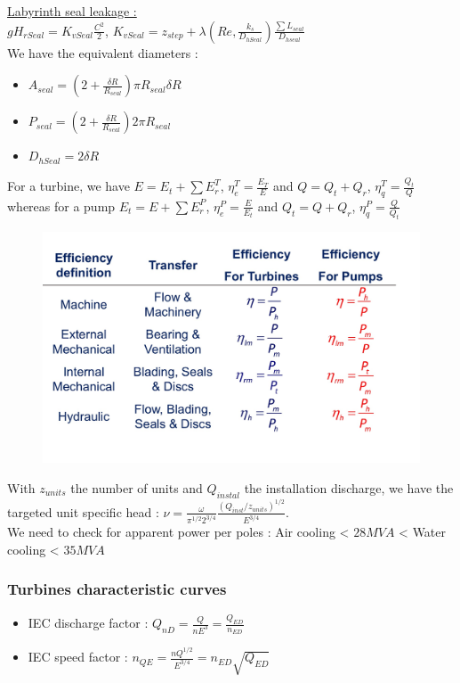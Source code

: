 \documentclass[../main.tex]{subfiles}
\begin{document}
\underline{Labyrinth seal leakage :}\\
$gH_{rSeal} = K_{vSeal} \frac{C^2}{2}$, $K_{vSeal} = z_{step} + \lambda(Re, \frac{k_s}{D_{hSeal}}) \frac{\sum L_{seal}}{D_{hseal}}$\\
We have the equivalent diameters : \begin{itemize}
    \item $A_{seal}= (2+ \frac{\delta R}{R_{seal}}) \pi R_{seal} \delta R$
    \item $P_{seal} = (2+\frac{\delta R}{R_{seal}})2\pi R_{seal}$
    \item $D_{hSeal} = 2\delta R$
\end{itemize}

For a turbine, we have $E = E_t + \sum E_r^T$, $\eta_e^T = \frac{E_T}{E}$ and $Q = Q_t + Q_r$, $\eta_q^T = \frac{Q_t}{Q}$ whereas for a pump $E_t = E + \sum E_r^P$, $\eta_e^P = \frac{E}{E_t}$ and $Q_t = Q+Q_r$, $\eta_q^P = \frac{Q}{Q_t}$\\

\begin{figure}[hbt!]
    \centering
    \includegraphics[width=0.6\linewidth]{IMAGES/Hydraulic/IMG_0182.jpeg}
\end{figure}

With $z_{units}$ the number of units and $Q_{instal}$ the installation discharge, we have the targeted unit specific head : $\nu = \frac{\omega}{\pi^{1/2} 2^{3/4}} \frac{(Q_{inst}/z_{units})^{1/2}}{E^{3/4}}$. \\
\warning We need to check for apparent power per poles : Air cooling < $28MVA$ < Water cooling < $35 MVA$\\

\subsubsection{Turbines characteristic curves}
\begin{itemize}
    \item IEC discharge factor : $Q_{nD} = \frac{Q}{nE^{3}} = \frac{Q_{ED}}{n_{ED}}$
    \item IEC speed factor : $n_{QE} = \frac{nQ^{1/2}}{E^{3/4}} = n_{ED} \sqrt{Q_{ED}}$
\end{itemize}
\end{document}
